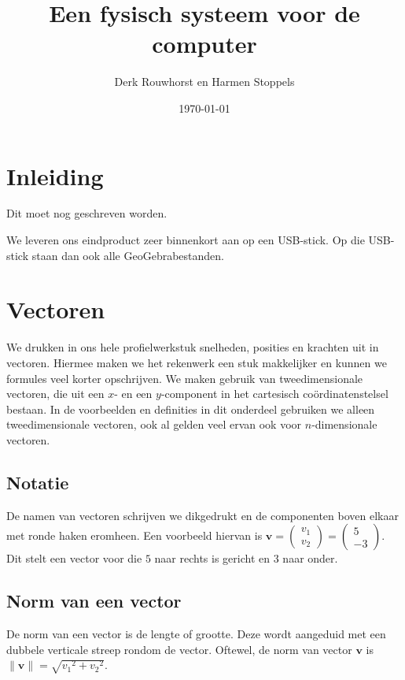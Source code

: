 \documentclass[12pt,a4paper]{article}
\title{Een fysisch systeem voor de computer}
\date{\today}
\author{Derk Rouwhorst en Harmen Stoppels}
\begin{document}
	\begin{titlepage}
		\maketitle
		\thispagestyle{empty}
	\end{titlepage}

	\tableofcontents
	\newpage
	
	\section{Inleiding}
	Dit moet nog geschreven worden.
	
	We leveren ons eindproduct zeer binnenkort aan op een USB-stick. Op die USB-stick staan dan ook alle GeoGebrabestanden.
	
	\newpage
	
	\section{Vectoren}
	We drukken in ons hele profielwerkstuk snelheden, posities en krachten uit in vectoren. Hiermee maken we het rekenwerk een stuk makkelijker en kunnen we formules veel korter opschrijven. We maken gebruik van tweedimensionale vectoren, die uit een $x$- en een $y$-component in het cartesisch co\"{o}rdinatenstelsel bestaan. In de voorbeelden en definities in dit onderdeel gebruiken we alleen tweedimensionale vectoren, ook al gelden veel ervan ook voor $n$-dimensionale vectoren.
	
	\subsection{Notatie}
	De namen van vectoren schrijven we dikgedrukt en de componenten boven elkaar met ronde haken eromheen. Een voorbeeld hiervan is $\mathbf{v} = \begin{pmatrix} v_1 \\ v_2 \end{pmatrix} = \begin{pmatrix} 5 \\ -3 \end{pmatrix}$. Dit stelt een vector voor die $5$ naar rechts is gericht en $3$ naar onder.
	
	\subsection{Norm van een vector}
	De norm van een vector is de lengte of grootte. Deze wordt aangeduid met een dubbele verticale streep rondom de vector. Oftewel, de norm van vector $\mathbf{v}$ is $\|\mathbf{v}\| = \sqrt{{v_1}^2+{v_2}^2}$.
	
\end{document}
